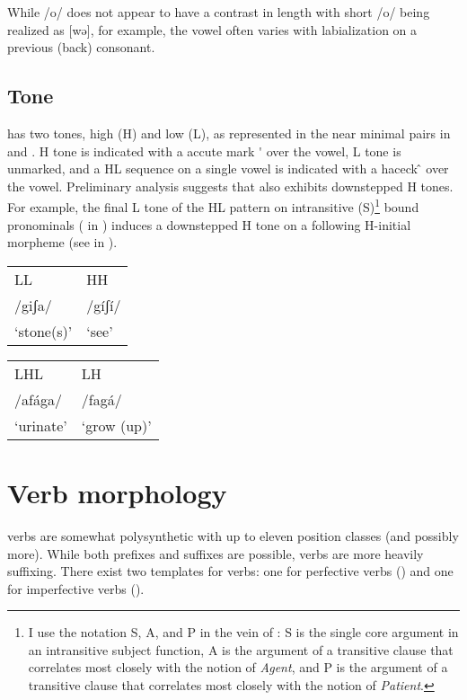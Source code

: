 \documentclass[output=paper]{langsci/langscibook}
\begin{document}
While /o/ does not appear to have a contrast in length with short /o/ being realized as [wə], for example, the vowel often varies with labialization on a previous (back) consonant. 


\subsection{Tone}\label{sec:ahlandc:3.3}

 has two tones, high (H) and low (L), as represented in the near minimal pairs in  and . H tone is indicated with a accute mark \'{ } over the vowel, L tone is unmarked, and a HL sequence on a single vowel is indicated with a haceck {} ̂ over the vowel. Preliminary analysis suggests that  also exhibits downstepped H tones. For example, the final L tone of the HL pattern on intransitive (S)\footnote{I use the notation S, A, and P in the vein of \citet{Comrie1989}: S is the single core argument in an intransitive subject function, A is the argument of a transitive clause that correlates most closely with the notion of \textit{Agent}, and P is the argument of a transitive clause that correlates most closely with the notion of \textit{Patient}.} bound pronominals ( in ) induces a downstepped H tone on a following H-initial morpheme (see  in ). 

\ea\label{ex:ahlandc:4}

\begin{tabular}{ll}
LL &   HH  \\
/giʃa/  &    /gíʃí/ \\
‘stone(s)’    &  ‘see’ \\
 \end{tabular}
\z

\ea\label{ex:ahlandc:5}

\begin{tabular}{ll}
LHL   &     LH \\
  /afága/   &  /fagá/ \\
  ‘urinate’  &  ‘grow (up)’ \\
\end{tabular}
\z 

\section{Verb morphology}\label{sec:ahlandc:4}

 verbs are somewhat polysynthetic with up to eleven position classes (and possibly more). While both prefixes and suffixes are possible, verbs are more heavily suffixing. There exist two templates for  verbs: one for perfective verbs () and one for imperfective verbs ().
\end{document}
